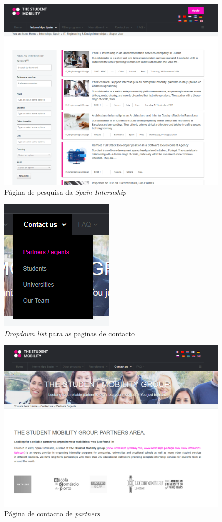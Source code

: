 \begin{figure}[h!tbp]
    \centering
    \includegraphics[width=0.9\linewidth]{capitulos/cap2-estadodaarte/assets/image/spain-internship/spain-search.png}
    \caption{Página de pesquisa da \textit{Spain Internship}}
    \label{fig:spain-search}
\end{figure}

\begin{figure}[h!tbp]
    \centering
    \includegraphics[width=0.3\linewidth]{capitulos/cap2-estadodaarte/assets/image/spain-internship/spain-contact-list.png}
    \caption{\textit{Dropdown list} para as paginas de contacto}
    \label{fig:spain-contact-list}
\end{figure}

\begin{figure}[h!tbp]
    \centering
    \includegraphics[width=0.7\linewidth]{capitulos/cap2-estadodaarte/assets/image/spain-internship/spain-contact-partners.png}
    \caption{Página de contacto de \textit{partners}}
    \label{fig:spain-contact-partners}
\end{figure}